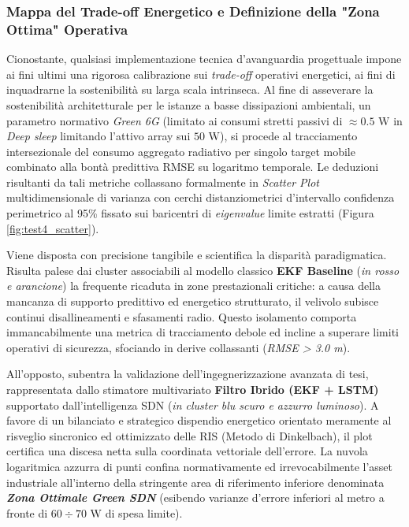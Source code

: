\documentclass[twoside]{article}
\begin{document}
\subsubsection{Mappa del Trade-off Energetico e Definizione della "Zona Ottima" Operativa}
Cionostante, qualsiasi implementazione tecnica d'avanguardia progettuale impone ai fini ultimi una rigorosa calibrazione sui \textit{trade-off} operativi energetici, ai fini di inquadrarne la sostenibilità su larga scala intrinseca.
Al fine di asseverare la sostenibilità architetturale per le istanze a basse dissipazioni ambientali, un parametro normativo \textit{Green 6G} (limitato ai consumi stretti passivi di $\approx 0.5\text{ W}$ in \textit{Deep sleep} limitando l'attivo array sui $50\text{ W}$), si procede al tracciamento intersezionale del consumo aggregato radiativo per singolo target mobile combinato alla bontà predittiva RMSE su logaritmo temporale. Le deduzioni risultanti da tali metriche collassano formalmente in \textit{Scatter Plot} multidimensionale di varianza con cerchi distanziometrici d'intervallo confidenza perimetrico al 95\% fissato sui baricentri di \textit{eigenvalue} limite estratti (Figura \ref{fig:test4_scatter}).

Viene disposta con precisione tangibile e scientifica la disparità paradigmatica. Risulta palese dai cluster associabili al modello classico \textbf{EKF Baseline} (\textit{in rosso e arancione}) la frequente ricaduta in zone prestazionali critiche: a causa della mancanza di supporto predittivo ed energetico strutturato, il velivolo subisce continui disallineamenti e sfasamenti radio. Questo isolamento comporta immancabilmente una metrica di tracciamento debole ed incline a superare limiti operativi di sicurezza, sfociando in derive collassanti (\textit{RMSE > 3.0 m}).

All'opposto, subentra la validazione dell'ingegnerizzazione avanzata di tesi, rappresentata dallo stimatore multivariato \textbf{Filtro Ibrido (EKF + LSTM)} supportato dall'intelligenza SDN (\textit{in cluster blu scuro e azzurro luminoso}). A favore di un bilanciato e strategico dispendio energetico orientato meramente al risveglio sincronico ed ottimizzato delle RIS (Metodo di Dinkelbach), il plot certifica una discesa netta sulla coordinata vettoriale dell'errore. La nuvola logaritmica azzurra di punti confina normativamente ed irrevocabilmente l'asset industriale all'interno della stringente area di riferimento inferiore denominata \textbf{\textit{Zona Ottimale Green SDN}} (esibendo varianze d'errore inferiori al metro a fronte di $60\div 70\text{ W}$ di spesa limite).
\end{document}
